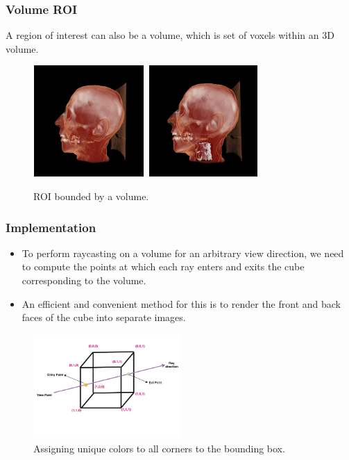 \documentclass{beamer}
\begin{document}
\begin{frame}
\frametitle{Volume ROI}
A region of interest can also be a volume, which is set of voxels within an 3D volume.
\begin{figure}
\centering
\includegraphics[height=120pt, width=120pt]{NON-VOI.png}
\includegraphics[height=120pt, width=120pt]{VOI.png}
\caption{\label{fig:ray_cast1.jpg} ROI bounded by a volume.}
\end{figure}
\end{frame}




\begin{frame}
\frametitle{Implementation}
\begin{itemize}
\item To perform raycasting on a volume for an arbitrary view direction, we need to compute the points at which each ray enters and exits the cube corresponding to the volume.
\item An efficient and convenient method for this is to render the front and back
faces of the cube into separate images.
\end{itemize}
\begin{figure}
\centering
\includegraphics[width=160pt]{cube.png}
\caption{Assigning unique colors to all corners to the bounding box.}
\end{figure}
\end{frame}
\end{document}
